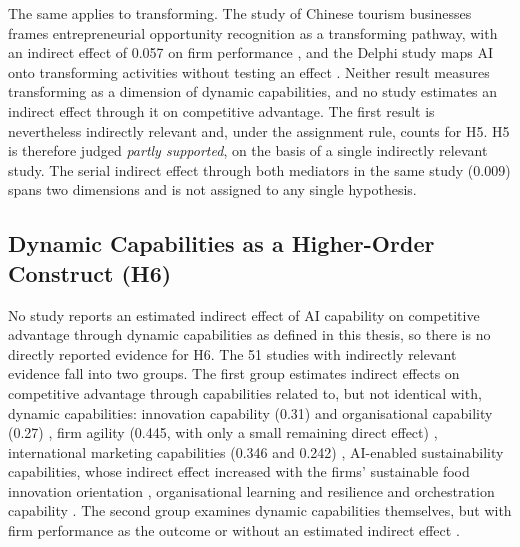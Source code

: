 The same applies to transforming. The study of Chinese tourism businesses frames entrepreneurial opportunity recognition as a transforming pathway, with an indirect effect of 0.057 on firm performance \parencite{li2026}, and the Delphi study maps AI onto transforming activities without testing an effect \parencite{ghobakhloo2025}. Neither result measures transforming as a dimension of dynamic capabilities, and no study estimates an indirect effect through it on competitive advantage. The first result is nevertheless indirectly relevant and, under the assignment rule, counts for H5. H5 is therefore judged \textit{partly supported}, on the basis of a single indirectly relevant study. The serial indirect effect through both mediators in the same study (0.009) spans two dimensions and is not assigned to any single hypothesis.

\subsection{Dynamic Capabilities as a Higher-Order Construct (H6)}
\label{sec:h6}

No study reports an estimated indirect effect of AI capability on competitive advantage through dynamic capabilities as defined in this thesis, so there is no directly reported evidence for H6. The 51 studies with indirectly relevant evidence fall into two groups. The first group estimates indirect effects on competitive advantage through capabilities related to, but not identical with, dynamic capabilities: innovation capability (0.31) and organisational capability (0.27) \parencite{malik2021}, firm agility (0.445, with only a small remaining direct effect) \parencite{srahin2026}, international marketing capabilities (0.346 and 0.242) \parencite{guo2025}, AI-enabled sustainability capabilities, whose indirect effect increased with the firms' sustainable food innovation orientation \parencite{texeira2026}, organisational learning and resilience \parencite{tu2026} and orchestration capability \parencite{dzreke2025}. The second group examines dynamic capabilities themselves, but with firm performance as the outcome or without an estimated indirect effect \parencite{almheiri2024, fano2025, neirafernandez2026}.

